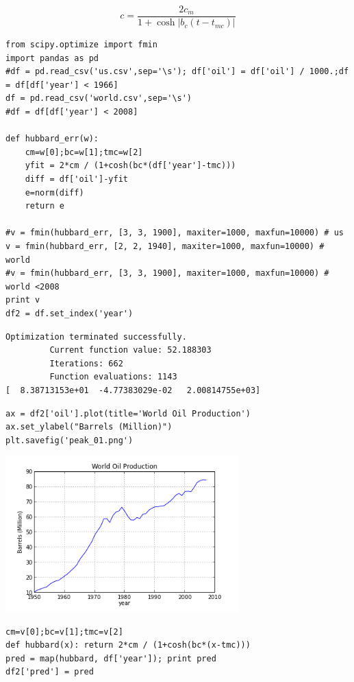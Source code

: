 \documentclass[12pt,fleqn]{article}\usepackage{../common}
\begin{document}
$$ 
c = \frac{ 2c_m}{1 + \cosh |b_c(t-t_{mc})|   }
$$


\begin{verbatim}
from scipy.optimize import fmin
import pandas as pd
#df = pd.read_csv('us.csv',sep='\s'); df['oil'] = df['oil'] / 1000.;df = df[df['year'] < 1966]
df = pd.read_csv('world.csv',sep='\s')
#df = df[df['year'] < 2008]

def hubbard_err(w):
    cm=w[0];bc=w[1];tmc=w[2]
    yfit = 2*cm / (1+cosh(bc*(df['year']-tmc)))
    diff = df['oil']-yfit
    e=norm(diff)
    return e

#v = fmin(hubbard_err, [3, 3, 1900], maxiter=1000, maxfun=10000) # us
v = fmin(hubbard_err, [2, 2, 1940], maxiter=1000, maxfun=10000) # world
#v = fmin(hubbard_err, [3, 3, 1900], maxiter=1000, maxfun=10000) # world <2008
print v
df2 = df.set_index('year')
\end{verbatim}

\begin{verbatim}
Optimization terminated successfully.
         Current function value: 52.188303
         Iterations: 662
         Function evaluations: 1143
[  8.38713153e+01  -4.77383029e-02   2.00814755e+03]
\end{verbatim}

\begin{verbatim}
ax = df2['oil'].plot(title='World Oil Production')
ax.set_ylabel("Barrels (Million)")
plt.savefig('peak_01.png')
\end{verbatim}


\includegraphics[height=6cm]{peak_01.png}

\begin{verbatim}
cm=v[0];bc=v[1];tmc=v[2]
def hubbard(x): return 2*cm / (1+cosh(bc*(x-tmc)))
pred = map(hubbard, df['year']); print pred
df2['pred'] = pred
\end{verbatim}
\end{document}
